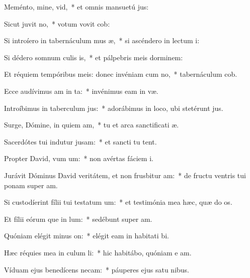 \item Meménto, mine, vid,~* et omnis mansuetú jus:
\item Sicut juvit no,~* votum vovit  cob:
\item Si introíero in tabernáculum mus æ,~* si ascéndero in lectum  i:
\item Si dédero somnum culis is,~* et pálpebris meis dorminem:
\item Et réquiem tempóribus meis: donec invéniam cum no,~* tabernáculum  cob.
\item Ecce audívimus am in ta:~* invénimus eam in  væ.
\item Introíbimus in taberculum jus:~* adorábimus in loco, ubi stetérunt  jus.
\item Surge, Dómine, in quiem am,~* tu et arca sanctificati æ.
\item Sacerdótes tui indutur jusam:~* et sancti tu tent.
\item Propter David, vum um:~* non avértas fáciem  i.
\item Jurávit Dóminus David veritátem, et non frusbitur am:~* de fructu ventris tui ponam super  am.
\item Si custodíerint fílii tui testatum um:~* et testimónia mea hæc, quæ do os.
\item Et fílii eórum que in lum:~* sedébunt super  am.
\item Quóniam elégit minus on:~* elégit eam in habitati bi.
\item Hæc réquies mea in culum li:~* hic habitábo, quóniam e am.
\item Víduam ejus benedícens necam:~* páuperes ejus satu nibus.
